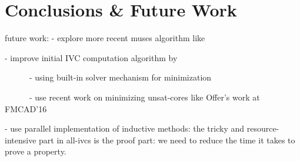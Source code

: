\section{Conclusions \& Future Work}
\label{sec:conc}

 future work:
 - explore more recent muses algorithm like \cite{Bacchus2016}
 
 - improve initial IVC computation algorithm by
 
~~~~~~- using built-in solver mechanism for minimization

~~~~~~- use recent work on minimizing unsat-cores like Offer's work at FMCAD'16

 - use parallel implementation of inductive methods: 
 the tricky and resource-intensive part in all-ivcs is the proof part: we need to reduce the time it takes to prove a property. 